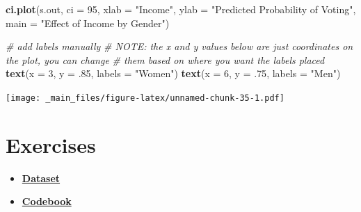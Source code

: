 \documentclass[]{article}
\newenvironment{Shaded}{\begin{snugshade}}{\end{snugshade}}
\newcommand{\KeywordTok}[1]{\textcolor[rgb]{0.13,0.29,0.53}{\textbf{{#1}}}}
\newcommand{\DataTypeTok}[1]{\textcolor[rgb]{0.13,0.29,0.53}{{#1}}}
\newcommand{\DecValTok}[1]{\textcolor[rgb]{0.00,0.00,0.81}{{#1}}}
\newcommand{\StringTok}[1]{\textcolor[rgb]{0.31,0.60,0.02}{{#1}}}
\newcommand{\CommentTok}[1]{\textcolor[rgb]{0.56,0.35,0.01}{\textit{{#1}}}}
\newcommand{\NormalTok}[1]{{#1}}
\providecommand{\tightlist}{%
  \setlength{\itemsep}{0pt}\setlength{\parskip}{0pt}}
\theoremstyle{definition}
\theoremstyle{definition}
\theoremstyle{remark}
\begin{document}
\begin{Shaded}
\begin{Highlighting}[]
\KeywordTok{ci.plot}\NormalTok{(s.out, }
        \DataTypeTok{ci =} \DecValTok{95}\NormalTok{,}
        \DataTypeTok{xlab =} \StringTok{"Income"}\NormalTok{, }
        \DataTypeTok{ylab =} \StringTok{"Predicted Probability of Voting"}\NormalTok{,}
        \DataTypeTok{main =} \StringTok{"Effect of Income by Gender"}\NormalTok{)}

\CommentTok{# add labels manually}
\CommentTok{# NOTE: the x and y values below are just coordinates on the plot, you can change }
\CommentTok{#       them based on where you want the labels placed}
\KeywordTok{text}\NormalTok{(}\DataTypeTok{x =} \DecValTok{3}\NormalTok{, }\DataTypeTok{y =} \NormalTok{.}\DecValTok{85}\NormalTok{, }\DataTypeTok{labels =} \StringTok{"Women"}\NormalTok{)  }
\KeywordTok{text}\NormalTok{(}\DataTypeTok{x =} \DecValTok{6}\NormalTok{, }\DataTypeTok{y =} \NormalTok{.}\DecValTok{75}\NormalTok{, }\DataTypeTok{labels =} \StringTok{"Men"}\NormalTok{)    }
\end{Highlighting}
\end{Shaded}

\texttt{[image: \_main\_files/figure-latex/unnamed-chunk-35-1.pdf]}

\section{Exercises}\label{exercises}

\begin{itemize}
\tightlist
\item
  \textbf{\href{http://uclspp.github.io/PUBLG100/data/mroz.dta}{Dataset}}
\item
  \textbf{\href{http://uclspp.github.io/PUBLG100/data/mroz.txt}{Codebook}}
\end{itemize}
\end{document}
